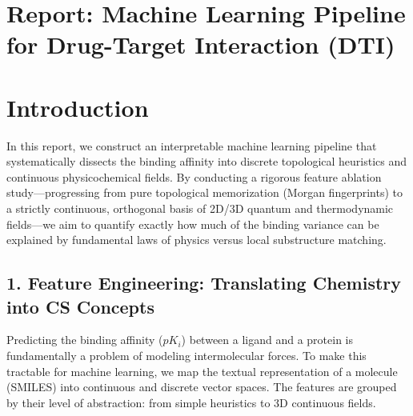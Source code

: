 \documentclass[11pt, a4paper]{article}
\begin{document}
\section*{Report: Machine Learning Pipeline for Drug-Target Interaction (DTI)}

\section*{Introduction}
In this report, we construct an interpretable machine learning pipeline that systematically dissects the binding affinity into discrete
topological heuristics and continuous physicochemical fields. By conducting a rigorous feature ablation study—progressing from pure topological
memorization (Morgan fingerprints) to a strictly continuous, orthogonal basis of 2D/3D quantum and thermodynamic fields—we aim to quantify
exactly how much of the binding variance can be explained by fundamental laws of physics versus local substructure matching.

\subsection*{1. Feature Engineering: Translating Chemistry into CS Concepts}
Predicting the binding affinity ($pK_i$) between a ligand and a protein is fundamentally a problem of modeling intermolecular forces. To make this
tractable for machine learning, we map the textual representation of a molecule (SMILES) into continuous and discrete vector spaces. The features
are grouped by their level of abstraction: from simple heuristics to 3D continuous fields.
\end{document}

